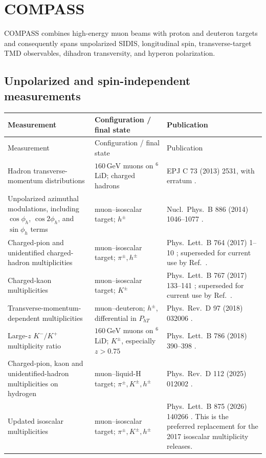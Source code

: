 \documentclass[11pt]{article}
\newcommand{\pt}{P_{hT}}
\newcommand{\GeV}{\mathrm{GeV}}
\begin{document}
\section{COMPASS}

COMPASS combines high-energy muon beams with proton and deuteron targets and consequently spans
unpolarized SIDIS, longitudinal spin, transverse-target TMD observables, dihadron transversity, and
hyperon polarization.

\subsection{Unpolarized and spin-independent measurements}

\small
\begin{longtable}{@{}p{}p{}p{}@{}}
\toprule
Measurement & Configuration / final state & Publication \\ \midrule
\endfirsthead
\toprule
Measurement & Configuration / final state & Publication \\ \midrule
\endhead
Hadron transverse-momentum distributions &
$160\,\GeV$ muons on $^6$LiD; charged hadrons &
EPJ C 73 (2013) 2531, with erratum \cite{COMPASS:pt2013}. \\

Unpolarized azimuthal modulations, including $\cos\phi_h$, $\cos 2\phi_h$, and $\sin\phi_h$ terms &
muon--isoscalar target; $h^\pm$ &
Nucl.\ Phys.\ B 886 (2014) 1046--1077 \cite{COMPASS:azimuth2014}. \\

Charged-pion and unidentified charged-hadron multiplicities &
muon--isoscalar target; $\pi^\pm,h^\pm$ &
Phys.\ Lett.\ B 764 (2017) 1--10 \cite{COMPASS:pionmult2017}; superseded for current use by
Ref.~\cite{COMPASS:addendum2026}. \\

Charged-kaon multiplicities &
muon--isoscalar target; $K^\pm$ &
Phys.\ Lett.\ B 767 (2017) 133--141 \cite{COMPASS:kaonmult2017}; superseded for current use by
Ref.~\cite{COMPASS:addendum2026}. \\

Transverse-momentum-dependent multiplicities &
muon--deuteron; $h^\pm$, differential in $\pt$ &
Phys.\ Rev.\ D 97 (2018) 032006 \cite{COMPASS:tmdmult2018}. \\

Large-$z$ $K^-/K^+$ multiplicity ratio &
$160\,\GeV$ muons on $^6$LiD; $K^\pm$, especially $z>0.75$ &
Phys.\ Lett.\ B 786 (2018) 390--398 \cite{COMPASS:Kratio2018}. \\

Charged-pion, kaon and unidentified-hadron multiplicities on hydrogen &
muon--liquid-H target; $\pi^\pm,K^\pm,h^\pm$ &
Phys.\ Rev.\ D 112 (2025) 012002 \cite{COMPASS:Hmult2025}. \\

Updated isoscalar multiplicities &
muon--isoscalar target; $\pi^\pm,K^\pm,h^\pm$ &
Phys.\ Lett.\ B 875 (2026) 140266 \cite{COMPASS:addendum2026}.  This is the preferred replacement
for the 2017 isoscalar multiplicity releases. \\
\bottomrule
\end{longtable}
\normalsize
\end{document}
